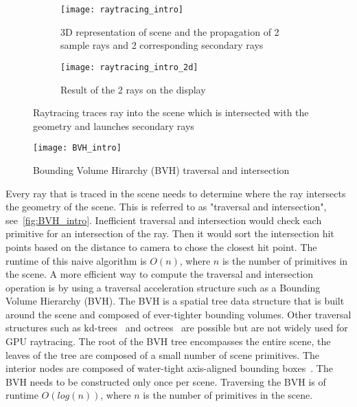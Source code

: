 \begin{figure}
\centering
\begin{subfigure}[t]{.45\textwidth}
  \centering
  \texttt{[image: raytracing\_intro]}
  \caption{3D representation of scene and the propagation of 2 sample rays and 2 corresponding secondary rays} 
  \label{fig:sub1}
\end{subfigure}%
 \hfill
\begin{subfigure}[t]{.45\textwidth}
  \centering
  \texttt{[image: raytracing\_intro\_2d]}
  \caption{Result of the 2 rays on the display}
  \label{fig:sub2}
\end{subfigure}
\caption{\label{fig:raytracing_intro_fig}
           Raytracing traces ray into the scene which is intersected with the geometry and launches secondary rays }
\end{figure}

\begin{figure}[htb]
  \centering
  \texttt{[image: BVH\_intro]}
 
  \caption{\label{fig:BVH_intro}Bounding Volume Hirarchy (BVH) traversal and intersection}
\end{figure}

Every ray that is traced in the scene needs to determine where the ray intersects the geometry of the scene. This is referred to as "traversal and intersection", see~\autoref{fig:BVH_intro}.
Inefficient traversal and intersection would check each primitive for an intersection of the ray. Then it would sort the intersection hit points based on the distance to camera to chose the closest hit point. The runtime of this naive algorithm is $O(n)$, where $n$ is the number of primitives in the scene. 
A more efficient way to compute the traversal and intersection operation is by using a traversal acceleration structure such as a Bounding Volume Hierarchy (BVH). The BVH is a spatial tree data structure that is built around the scene and composed of ever-tighter bounding volumes. Other traversal structures such as kd-trees~\cite{10.5555/3044805.3044826} and octrees~\cite{10.5555/2421196.2421200} are possible but are not widely used for GPU raytracing. 
The root of the BVH tree encompasses the entire scene, the leaves of the tree are composed of a small number of scene primitives. The interior nodes are composed of water-tight axis-aligned bounding boxes~\cite{Pharr:2010:PBR:1854996}.
The BVH needs to be constructed only once per scene. Traversing the BVH is of runtime $O(log(n))$, where $n$ is the number of primitives in the scene.

